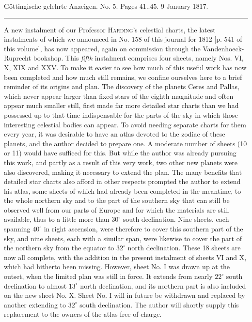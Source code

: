 \clearpage
{}
\hypertarget{native-598-lower}{}
\begin{center}\small Göttingische gelehrte Anzeigen. No. 5. Pages 41..45. 9 January 1817.\\[3pt]\rule{.72\linewidth}{.3pt}\end{center}

A new instalment of our Professor \textsc{Harding}’s celestial charts, the latest instalments of which we announced in No. 158 of this journal for 1812 [p. 541 of this volume], has now appeared, again on commission through the Vandenhoeck-Ruprecht bookshop. This \emph{fifth} instalment comprises four sheets, namely Nos. VI, X, XIX and XXV. To make it easier to see how much of this useful work has now been completed and how much still remains, we confine ourselves here to a brief reminder of its origins and plan. The discovery of the planets Ceres and Pallas, which never appear larger than fixed stars of the eighth magnitude and often appear much smaller still, first made far more detailed star charts than we had possessed up to that time indispensable for the parts of the sky in which those interesting celestial bodies can appear. To avoid needing separate charts for them every year, it was desirable to have an atlas devoted to the zodiac of these planets, and the author decided to prepare one. A moderate number of sheets (10 or 11) would have sufficed for this. But while the author was already pursuing this work, and partly as a result of this very work, two other new planets were also discovered, making it necessary to extend the plan. The many benefits that detailed star charts also afford in other respects prompted the author to extend his atlas, some sheets of which had already been completed in the meantime, to the whole northern sky and to the part of the southern sky that can still be observed well from our parts of Europe and for which the materials are still available, thus to a little more than $30^\circ$ south declination. Nine sheets, each spanning $40^\circ$ in right ascension, were therefore to cover this southern part of the sky, and nine sheets, each with a similar span, were likewise to cover the part of the northern sky from the equator to $32^\circ$ north declination. These 18 sheets are now all complete, with the addition in the present instalment of sheets VI and X, which had hitherto been missing. However, sheet No. I was drawn up at the outset, when the limited plan was still in force. It extends from nearly $22^\circ$ south declination to almost $13^\circ$ north declination, and its northern part is also included on the new sheet No. X. Sheet No. I will in future be withdrawn and replaced by another extending to $32^\circ$ south declination. The author will shortly supply this replacement to the owners of the atlas free of charge.


